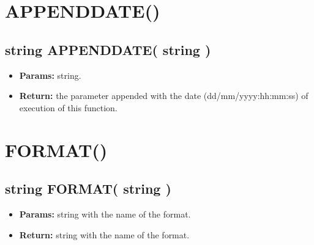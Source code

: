 \documentclass[11pt,a4paper]{article}
\begin{document}
\section*{APPENDDATE()}
\begin{framed}
\subsection*{string APPENDDATE( string )}
\begin{itemize}
\item \textbf{Params:} string.
\item \textbf{Return:} the parameter appended with the date (dd/mm/yyyy:hh:mm:ss) of execution of this function.
\end{itemize}
\end{framed}

\section*{FORMAT()}
\begin{framed}
\subsection*{string FORMAT( string )}
\begin{itemize}
\item \textbf{Params:} string with the name of the format.
\item \textbf{Return:} string with the name of the format.
\end{itemize}
\end{framed}
\end{document}
